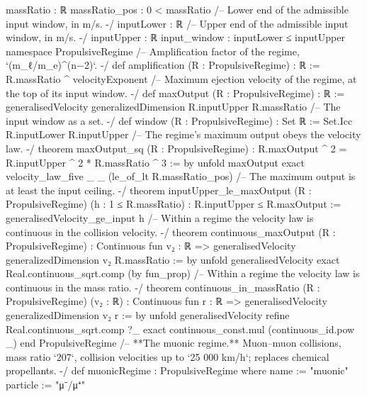 \documentclass[11pt,a4paper]{article}
\begin{document}
{  massRatio : ℝ
  massRatio\_\allowbreak{}pos : 0 \textless{} massRatio
  /-- Lower end of the admissible input window, in m/s. -/
  inputLower : ℝ
  /-- Upper end of the admissible input window, in m/s. -/
  inputUpper : ℝ
  input\_\allowbreak{}window : inputLower ≤ inputUpper
\mbox{}
namespace PropulsiveRegime
\mbox{}
/-- Amplification factor of the regime, `(m\_\allowbreak{}ℓ/m\_\allowbreak{}e)\textasciicircum{}(n−2)`. -/
def amplification (R : PropulsiveRegime) : ℝ := R.massRatio \textasciicircum{} velocityExponent
\mbox{}
/-- Maximum ejection velocity of the regime, at the top of its input window. -/
def maxOutput (R : PropulsiveRegime) : ℝ :=
  generalisedVelocity generalizedDimension R.inputUpper R.massRatio
\mbox{}
/-- The input window as a set. -/
def window (R : PropulsiveRegime) : Set ℝ := Set.Icc R.inputLower R.inputUpper
\mbox{}
/-- The regime's maximum output obeys the velocity law. -/
theorem maxOutput\_\allowbreak{}sq (R : PropulsiveRegime) :
    R.maxOutput \textasciicircum{} 2 = R.inputUpper \textasciicircum{} 2 * R.massRatio \textasciicircum{} 3 := by
  unfold maxOutput
  exact velocity\_\allowbreak{}law\_\allowbreak{}five \_\allowbreak{} \_\allowbreak{} (le\_\allowbreak{}of\_\allowbreak{}lt R.massRatio\_\allowbreak{}pos)
\mbox{}
/-- The maximum output is at least the input ceiling. -/
theorem inputUpper\_\allowbreak{}le\_\allowbreak{}maxOutput (R : PropulsiveRegime) (h : 1 ≤ R.massRatio) :
    R.inputUpper ≤ R.maxOutput :=
  generalisedVelocity\_\allowbreak{}ge\_\allowbreak{}input h
\mbox{}
/-- Within a regime the velocity law is continuous in the collision velocity. -/
theorem continuous\_\allowbreak{}maxOutput (R : PropulsiveRegime) :
    Continuous fun v₂ : ℝ =\textgreater{} generalisedVelocity generalizedDimension v₂ R.massRatio := by
  unfold generalisedVelocity
  exact Real.continuous\_\allowbreak{}sqrt.comp (by fun\_\allowbreak{}prop)
\mbox{}
/-- Within a regime the velocity law is continuous in the mass ratio. -/
theorem continuous\_\allowbreak{}in\_\allowbreak{}massRatio (R : PropulsiveRegime) (v₂ : ℝ) :
    Continuous fun r : ℝ =\textgreater{} generalisedVelocity generalizedDimension v₂ r := by
  unfold generalisedVelocity
  refine Real.continuous\_\allowbreak{}sqrt.comp ?\_\allowbreak{}
  exact continuous\_\allowbreak{}const.mul (continuous\_\allowbreak{}id.pow \_\allowbreak{})
\mbox{}
end PropulsiveRegime
\mbox{}
/-- **The muonic regime.**  Muon–muon collisions, mass ratio `207`, collision
velocities up to `25 000 km/h`; replaces chemical propellants. -/
def muonicRegime : PropulsiveRegime where
  name := "muonic"
  particle := "μ⁻/μ⁺"
}
\end{document}

